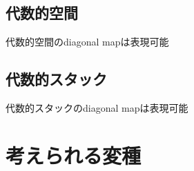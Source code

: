 \documentclass[lualatex, ja=standard, a4paper]{bxjsarticle}
\newcommand{\FPPF}  {\mathrm{FPPF}}
\begin{document}
\subsection{代数的空間}
\begin{Def}[チャート付き層としての代数的空間]
\end{Def}

\begin{Prop}
    代数的空間のdiagonal mapは表現可能
\end{Prop}

\subsection{代数的スタック}
\begin{Def}[チャート付きスタックとしての代数的スタック]
\end{Def}

\begin{Prop}
    代数的スタックのdiagonal mapは表現可能
\end{Prop}

\section{考えられる変種}

\printbibliography[title=参考文献]
\end{document}
